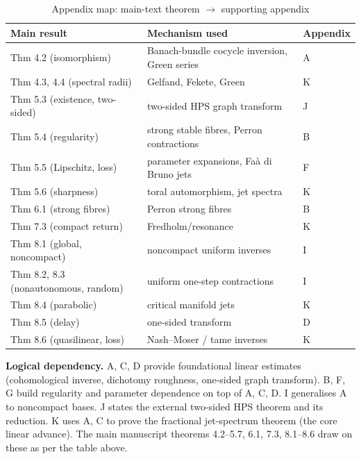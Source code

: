 \documentclass[12pt,a4paper]{article}
\theoremstyle{plain}
\numberwithin{equation}{section}
\numberwithin{theorem}{section}
\begin{document}
\begin{table}[h]
\centering
\caption{Appendix map: main-text theorem $\to$ supporting appendix}
\label{tab:supp-map-tex}
\begin{tabular}{@{}lll@{}}
\toprule
\textbf{Main result} & \textbf{Mechanism used} & \textbf{Appendix} \\
\midrule
Thm 4.2 (isomorphism) & Banach-bundle cocycle inversion, Green series & A \\
Thm 4.3, 4.4 (spectral radii) & Gelfand, Fekete, Green & K \\
Thm 5.3 (existence, two-sided) & two-sided HPS graph transform & J \\
Thm 5.4 (regularity) & strong stable fibres, Perron contractions & B \\
Thm 5.5 (Lipschitz, loss) & parameter expansions, Fa\`a di Bruno jets & F \\
Thm 5.6 (sharpness) & toral automorphism, jet spectra & K \\
Thm 6.1 (strong fibres) & Perron strong fibres & B \\
Thm 7.3 (compact return) & Fredholm/resonance & K \\
Thm 8.1 (global, noncompact) & noncompact uniform inverses & I \\
Thm 8.2, 8.3 (nonautonomous, random) & uniform one-step contractions & I \\
Thm 8.4 (parabolic) & critical manifold jets & K \\
Thm 8.5 (delay) & one-sided transform & D \\
Thm 8.6 (quasilinear, loss) & Nash--Moser / tame inverses & K \\
\bottomrule
\end{tabular}
\end{table}

\vspace{1em}

\noindent
\textbf{Logical dependency.} 
A, C, D provide foundational linear estimates (cohomological inverse, dichotomy roughness, one-sided graph transform).
B, F, G build regularity and parameter dependence on top of A, C, D.
I generalises A to noncompact bases.
J states the external two-sided HPS theorem and its reduction.
K uses A, C to prove the fractional jet-spectrum theorem (the core linear advance).
The main manuscript theorems 4.2--5.7, 6.1, 7.3, 8.1--8.6 draw on these as per the table above.

\clearpage

\end{document}
